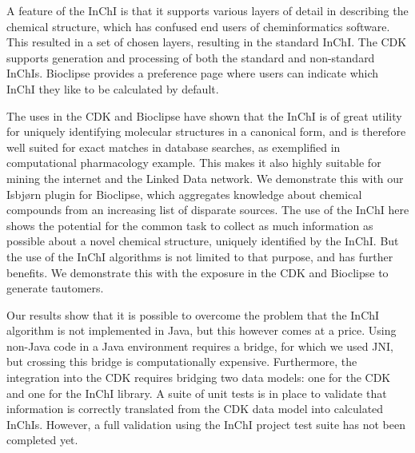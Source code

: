 \documentclass[10pt]{bmc_article}
\newenvironment{bmcformat}{\fussy\setboolean{publ}{true}}{\fussy}
\begin{document}
\begin{bmcformat}
A feature of the InChI is that it supports various layers of detail in describing the chemical structure,
which has confused end users of cheminformatics software. This resulted in a set of chosen layers, resulting
in the standard InChI. The CDK supports generation and processing of both the standard and non-standard InChIs.
Bioclipse provides a preference page where users can indicate which InChI they like to be calculated by
default.

The uses in the CDK and Bioclipse have shown that the InChI is of great utility for uniquely identifying
molecular structures in a canonical form, and is therefore well suited for exact matches in database searches, 
as exemplified in computational pharmacology example. This makes it also highly suitable for mining the
internet and the Linked Data network. We demonstrate this with our Isbjørn plugin for Bioclipse, which
aggregates knowledge about chemical compounds from an increasing list of disparate sources. The use of the
InChI here shows the potential for the common task to collect as much information as possible about a
novel chemical structure, uniquely identified by the InChI. But the use of the InChI algorithms is not limited to
that purpose, and has further benefits. We demonstrate this with the exposure in the CDK and Bioclipse to
generate tautomers. 

Our results show that it is possible to overcome the problem that the InChI algorithm is not implemented
in Java, but this however comes at a price. Using non-Java code in a Java environment requires a bridge, for which
we used JNI, but crossing this bridge is computationally expensive. Furthermore, the integration into the
CDK requires bridging two data models: one for the CDK and one for the InChI library. A suite of unit
tests is in place to validate that information is correctly translated from the CDK data model into
calculated InChIs. However, a full validation using the InChI project test suite has not been completed
yet.



\end{bmcformat}
\end{document}
